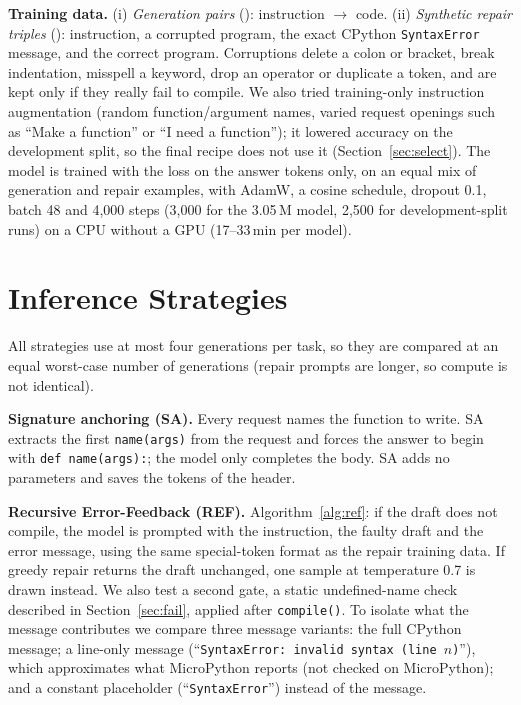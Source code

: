 \textbf{Training data.} (i) \emph{Generation pairs} (\ntraingen{}): instruction $\rightarrow$ code. (ii) \emph{Synthetic repair triples} (\ntrainrepair{}): instruction, a corrupted program, the exact CPython \texttt{SyntaxError} message, and the correct program. Corruptions delete a colon or bracket, break indentation, misspell a keyword, drop an operator or duplicate a token, and are kept only if they really fail to compile. We also tried training-only instruction augmentation (random function/argument names, varied request openings such as ``Make a function'' or ``I need a function''); it lowered accuracy on the development split, so the final recipe does not use it (Section~\ref{sec:select}). The model is trained with the loss on the answer tokens only, on an equal mix of generation and repair examples, with AdamW, a cosine schedule, dropout 0.1, batch 48 and 4{,}000 steps (3{,}000 for the 3.05\,M model, 2{,}500 for development-split runs) on a CPU without a GPU (17--33\,min per model).

\section{Inference Strategies}
All strategies use at most four generations per task, so they are compared at an equal worst-case number of generations (repair prompts are longer, so compute is not identical).

\textbf{Signature anchoring (SA).} Every request names the function to write. SA extracts the first \texttt{name(args)} from the request and forces the answer to begin with \texttt{def name(args):}; the model only completes the body. SA adds no parameters and saves the tokens of the header.

\textbf{Recursive Error-Feedback (REF).} Algorithm~\ref{alg:ref}: if the draft does not compile, the model is prompted with the instruction, the faulty draft and the error message, using the same special-token format as the repair training data. If greedy repair returns the draft unchanged, one sample at temperature 0.7 is drawn instead. We also test a second gate, a static undefined-name check described in Section~\ref{sec:fail}, applied after \texttt{compile()}. To isolate what the message contributes we compare three message variants: the full CPython message; a line-only message (``\texttt{SyntaxError: invalid syntax (line $n$)}''), which approximates what MicroPython reports (not checked on MicroPython); and a constant placeholder (``\texttt{SyntaxError}'') instead of the message.

